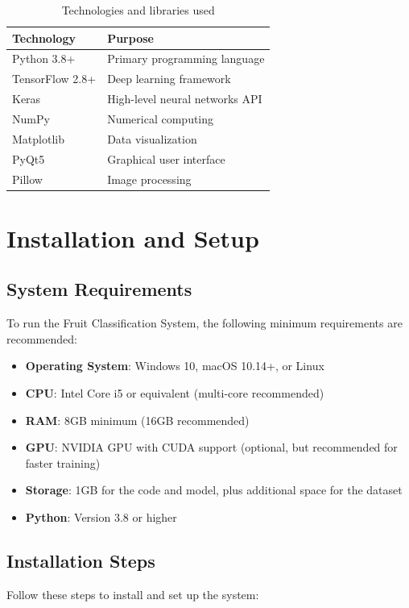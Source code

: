 \documentclass[11pt,a4paper]{report}
\begin{document}
\begin{table}[H]
    \centering
    \begin{tabular}{ll}
        \toprule
        \textbf{Technology} & \textbf{Purpose} \\
        \midrule
        Python 3.8+ & Primary programming language \\
        TensorFlow 2.8+ & Deep learning framework \\
        Keras & High-level neural networks API \\
        NumPy & Numerical computing \\
        Matplotlib & Data visualization \\
        PyQt5 & Graphical user interface \\
        Pillow & Image processing \\
        \bottomrule
    \end{tabular}
    \caption{Technologies and libraries used}
    \label{tab:technologies}
\end{table}

\chapter{Installation and Setup}

\section{System Requirements}
To run the Fruit Classification System, the following minimum requirements are recommended:

\begin{itemize}
    \item \textbf{Operating System}: Windows 10, macOS 10.14+, or Linux
    \item \textbf{CPU}: Intel Core i5 or equivalent (multi-core recommended)
    \item \textbf{RAM}: 8GB minimum (16GB recommended)
    \item \textbf{GPU}: NVIDIA GPU with CUDA support (optional, but recommended for faster training)
    \item \textbf{Storage}: 1GB for the code and model, plus additional space for the dataset
    \item \textbf{Python}: Version 3.8 or higher
\end{itemize}

\section{Installation Steps}
Follow these steps to install and set up the system:
\end{document}
